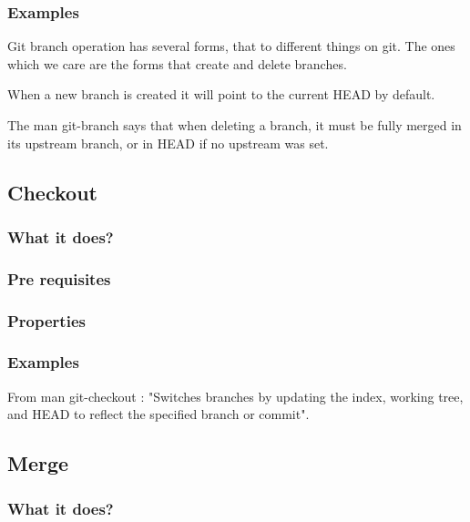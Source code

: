 \subsubsection{Examples}
Git branch operation has several forms, that to different things on git.
The ones which we care are the forms that create and delete branches. \par
When a new branch is created it will point to the current HEAD by default.
\par


The man git-branch says that when deleting a branch, it must be fully
merged in its upstream branch, or in HEAD if no upstream was set. \par


\subsection{Checkout}

\subsubsection{What it does?}
\subsubsection{Pre requisites}
\subsubsection{Properties}
\subsubsection{Examples}
From man git-checkout : "Switches branches by updating the index, 
working tree, and HEAD to reflect the specified branch or commit". \par

\subsection{Merge}

\subsubsection{What it does?}

